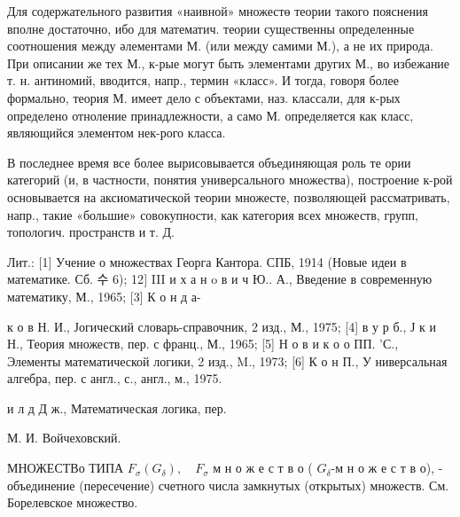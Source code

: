 \documentclass[10pt]{article}
\begin{document}
Для содержательного развития «наивной» множестө теории такого пояснения вполне достаточно, ибо для математич. теории существенны определенные соотношения между әлементами М. (или между самими М.), а не их природа. При описании же тех М., к-рые могут быть элементами других М., во избежание т. н. антиномий, вводится, напр., термин «класс». И тогда, говоря более формально, теория М. имеет дело с объектами, наз. классали, для к-рых определено отноление принадлежности, а само М. определяется как класс, являющийся элементом нек-рого класса.



В последнее время все более вырисовывается объединяющая роль те ории категорий (и, в частности, понятия универсального множества), построение к-рой основывается на аксиоматической теории множесте, позволяющей рассматривать, напр., такие «большие» совокупности, как категория всех множеств, групп, топологич. пространств и т. Д.



Лит.: [1] Учение о множествах Георга Кантора. СПБ, 1914 (Новые идеи в математике. Сб. 수 6); 12$]$ III и х а н o в и ч Ю.. А., Введение в современную математику, М., 1965; [3] К о н д а-

к о в Н. И., Јогический словарь-справочник, 2 изд., М., 1975; [4] в у р б., Ј к и Н., Теория множеств, пер. с франц., М., 1965; [5] Н о в и к о о ПП. 'С., Элементы математической логики, 2 изд., M., 1973; [6] К о н П., У ниверсальная алгебра, пер. с англ., с., англ., м., 1975.

и л д Д ж., Математическая логика, пер.

М. И. Войчеховский.



МНОЖЕСТВо ТИПА $F_{\sigma}\left(G_{\delta}\right), \quad F_{\sigma}$ м н о ж е с т в о ( $G_{\delta}$-м н $о$ ж е с т в о), - объединение (пересечение) счетного числа замкнутых (открытых) множеств. См. Борелевское множество.
\end{document}
